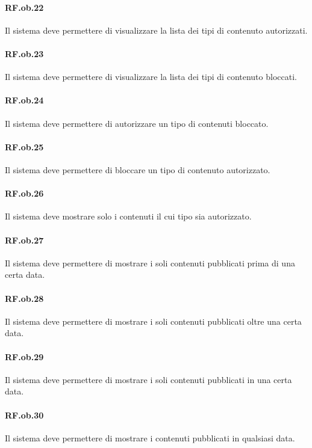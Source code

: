 \documentclass[10pt,a4paper,headinclude,footinclude,hidelinks]{scrreprt} %
\begin{document}
	\paragraph{RF.ob.22} Il sistema deve permettere di visualizzare la lista dei tipi di contenuto autorizzati.

	\paragraph{RF.ob.23} Il sistema deve permettere di visualizzare la lista dei tipi di contenuto bloccati.

	\paragraph{RF.ob.24} Il sistema deve permettere di autorizzare un tipo di contenuti bloccato.

	\paragraph{RF.ob.25} Il sistema deve permettere di bloccare un tipo di contenuto autorizzato.

	\paragraph{RF.ob.26} Il sistema deve mostrare solo i contenuti il cui tipo sia autorizzato.

	\paragraph{RF.ob.27} Il sistema deve permettere di mostrare i soli contenuti pubblicati prima di una certa data.

	\paragraph{RF.ob.28} Il sistema deve permettere di mostrare i soli contenuti pubblicati oltre una certa data.

	\paragraph{RF.ob.29} Il sistema deve permettere di mostrare i soli contenuti pubblicati in una certa data.

	\paragraph{RF.ob.30} Il sistema deve permettere di mostrare i contenuti pubblicati in qualsiasi data.
\end{document}
